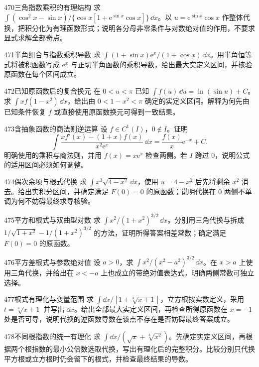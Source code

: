 \begin{exercise}{470}{三角指数乘积的有理结构}
求 $\int(\cos^2x-\sin x)/\{\cos x[1+\mathrm e^{\sin x}\cos x]\}\,\dd x$。以 $u=\mathrm e^{\sin x}\cos x$ 作整体代换，把积分化为有理函数形式；说明各分母非零条件与对数绝对值的作用，不要求显式求解全部奇点。
\end{exercise}
\begin{exercise}{471}{半角组合与指数乘积导数}
求 $\int(1+\sin x)\mathrm e^x/(1+\cos x)\,\dd x$。用半角恒等式将被积函数写成 $\mathrm e^x$ 与正切半角函数的乘积导数，给出最大实定义区间，并核验原函数在每个区间成立。
\end{exercise}
\begin{exercise}{472}{已知原函数后的复合换元}
在 $0<u<\pi$ 已知 $\int f(u)\,\dd u=\ln(\sin u)+C$。求 $\int xf(1-x^2)\,\dd x$，给出由 $0<1-x^2<\pi$ 确定的实定义区间。解释为何先由已知条件恢复 $f$ 或直接使用原函数换元可得到一致结果。
\end{exercise}
\begin{exercise}{473}{含抽象函数的商法则逆运算}
设 $f\in C^1(I)$，$0\notin I$。证明
\[\int\frac{xf'(x)-(1+x)f(x)}{x^2\mathrm e^x}\,\dd x=\frac{f(x)}x\mathrm e^{-x}+C.\]
明确使用的乘积与商法则，并用 $f(x)=x\mathrm e^x$ 检查两侧。若 $I$ 跨过 $0$，说明公式的适用区间必须如何调整。
\end{exercise}
\begin{exercise}{474}{偶次余项与根式代换}
求 $\int x^3\sqrt{4-x^2}\,\dd x$，使用 $u=4-x^2$ 后先将剩余 $x^2$ 消去。给出实积分区间，并确定满足 $F(0)=0$ 的原函数；说明代换在 $0$ 两侧不单调为何不妨碍最终求导核验。
\end{exercise}
\begin{exercise}{475}{平方和根式与双曲型对数}
求 $\int x^2/(1+x^2)^{3/2}\,\dd x$。分别用三角代换与拆成 $1/\sqrt{1+x^2}-1/(1+x^2)^{3/2}$ 的方法，证明所得答案相差常数；确定满足 $F(0)=0$ 的原函数。
\end{exercise}
\begin{exercise}{476}{平方差根式与参数绝对值}
设 $a>0$，求 $\int x^2/(x^2-a^2)^{3/2}\,\dd x$。在 $x>a$ 上使用三角代换，并给出在 $x<-a$ 上也成立的带绝对值表达式，明确两侧常数可独立选择。
\end{exercise}
\begin{exercise}{477}{根式有理化与变量范围}
求 $\int\dd x/[1+\sqrt[3]{x+1}]$，立方根按实数定义，采用 $t=\sqrt[3]{x+1}$ 并写出 $\dd x$。给出全部最大实定义区间，再检查所得原函数在 $x=-1$ 处是否可导，说明代换的逆函数导数在该点不存在是否妨碍最终答案成立。
\end{exercise}
\begin{exercise}{478}{不同根指数的统一有理化}
求 $\int\dd x/(\sqrt x+\sqrt[3]{x^2})$。先确定实定义区间，再根据两个根指数的最小公倍数选取代换，写出有理化后的完整积分。比较分别只代换平方根或立方根时仍会留下的根式，并检查最终结果的导数。
\end{exercise}
